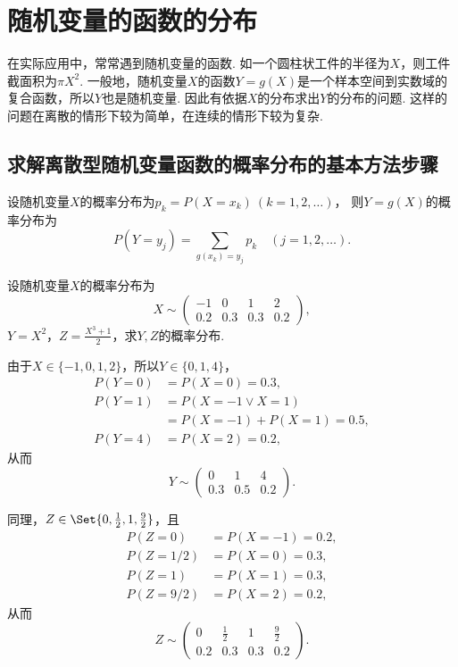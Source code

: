 \section{随机变量的函数的分布}
在实际应用中，常常遇到随机变量的函数.
如一个圆柱状工件的半径为\(X\)，则工件截面积为\(\pi X^2\).
一般地，随机变量\(X\)的函数\(Y=g(X)\)是一个样本空间到实数域的复合函数，所以\(Y\)也是随机变量.
因此有依据\(X\)的分布求出\(Y\)的分布的问题.
这样的问题在离散的情形下较为简单，在连续的情形下较为复杂.

\subsection{求解离散型随机变量函数的概率分布的基本方法步骤}
设随机变量\(X\)的概率分布为\(p_k = P(X = x_k)\ (k=1,2,\dotsc)\)，
则\(Y = g(X)\)的概率分布为\begin{equation*}
P(Y = y_j) = \sum_{g(x_k) = y_j} p_k
\quad(j=1,2,\dotsc).
\end{equation*}

\begin{example}
设随机变量\(X\)的概率分布为\begin{equation*}
X \sim \begin{pmatrix}
-1 & 0 & 1 & 2 \\
0.2 & 0.3 & 0.3 & 0.2
\end{pmatrix},
\end{equation*}\(Y=X^2\)，\(Z=\frac{X^3+1}{2}\)，求\(Y,Z\)的概率分布.
\begin{solution}
由于\(X\in\{-1,0,1,2\}\)，所以\(Y\in\{0,1,4\}\)，\begin{align*}
P(Y=0) &= P(X=0) = 0.3, \\
P(Y=1) &= P(X=-1 \lor X=1) \\
	&= P(X=-1) + P(X=1)
	= 0.5, \\
P(Y=4) &= P(X=2) = 0.2,
\end{align*}
从而\begin{equation*}
Y \sim \begin{pmatrix}
0 & 1 & 4 \\
0.3 & 0.5 & 0.2
\end{pmatrix}.
\end{equation*}

同理，\(Z\in\Set{0,\frac{1}{2},1,\frac{9}{2}}\)，且\begin{align*}
P(Z=0) &= P(X=-1) = 0.2, \\
P(Z=1/2) &= P(X=0) = 0.3, \\
P(Z=1) &= P(X=1) = 0.3, \\
P(Z=9/2) &= P(X=2) = 0.2,
\end{align*}
从而\begin{equation*}
Z \sim \begin{pmatrix}
0 & \frac{1}{2} & 1 & \frac{9}{2} \\
0.2 & 0.3 & 0.3 & 0.2
\end{pmatrix}.
\end{equation*}
\end{solution}
\end{example}

